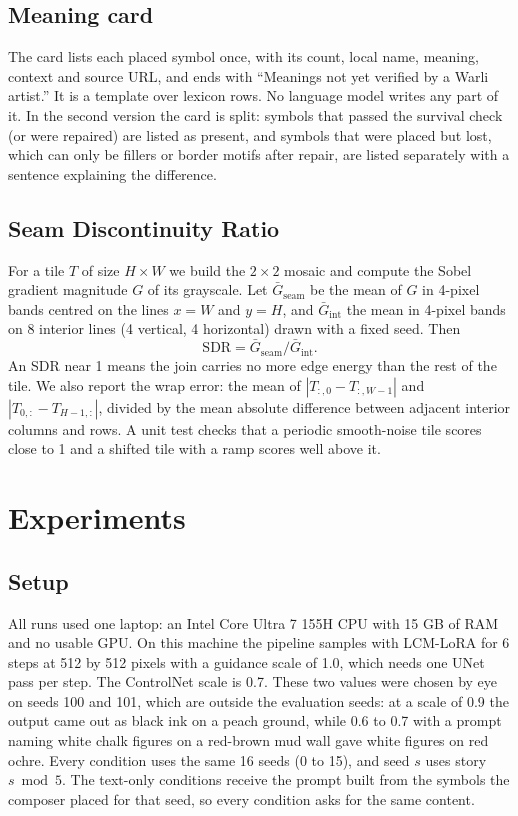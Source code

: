 \documentclass[conference]{IEEEtran}
\begin{document}
\subsection{Meaning card}

The card lists each placed symbol once, with its count, local name, meaning, context and source URL, and ends with ``Meanings not yet verified by a Warli artist.'' It is a template over lexicon rows. No language model writes any part of it. In the second version the card is split: symbols that passed the survival check (or were repaired) are listed as present, and symbols that were placed but lost, which can only be fillers or border motifs after repair, are listed separately with a sentence explaining the difference.

\subsection{Seam Discontinuity Ratio}

For a tile $T$ of size $H \times W$ we build the $2 \times 2$ mosaic and compute the Sobel gradient magnitude $G$ of its grayscale. Let $\bar{G}_{\mathrm{seam}}$ be the mean of $G$ in 4-pixel bands centred on the lines $x = W$ and $y = H$, and $\bar{G}_{\mathrm{int}}$ the mean in 4-pixel bands on 8 interior lines (4 vertical, 4 horizontal) drawn with a fixed seed. Then
\begin{equation}
\mathrm{SDR} = \bar{G}_{\mathrm{seam}} / \bar{G}_{\mathrm{int}}.
\end{equation}
An SDR near 1 means the join carries no more edge energy than the rest of the tile. We also report the wrap error: the mean of $|T_{:,0} - T_{:,W-1}|$ and $|T_{0,:} - T_{H-1,:}|$, divided by the mean absolute difference between adjacent interior columns and rows. A unit test checks that a periodic smooth-noise tile scores close to 1 and a shifted tile with a ramp scores well above it.

\section{Experiments}

\subsection{Setup}

All runs used one laptop: an Intel Core Ultra 7 155H CPU with 15 GB of RAM and no usable GPU. On this machine the pipeline samples with LCM-LoRA for 6 steps at 512 by 512 pixels with a guidance scale of 1.0, which needs one UNet pass per step. The ControlNet scale is 0.7. These two values were chosen by eye on seeds 100 and 101, which are outside the evaluation seeds: at a scale of 0.9 the output came out as black ink on a peach ground, while 0.6 to 0.7 with a prompt naming white chalk figures on a red-brown mud wall gave white figures on red ochre. Every condition uses the same 16 seeds (0 to 15), and seed $s$ uses story $s \bmod 5$. The text-only conditions receive the prompt built from the symbols the composer placed for that seed, so every condition asks for the same content.
\end{document}
